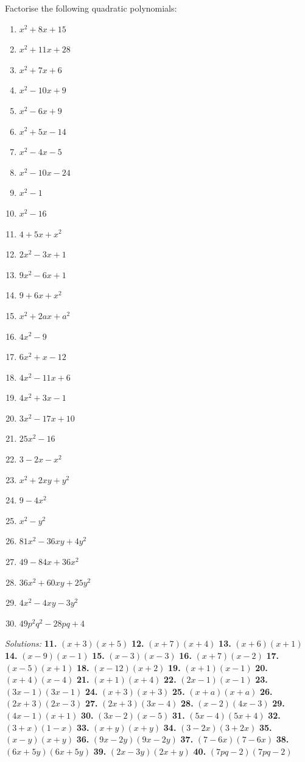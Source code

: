 \documentclass[
  12pt,
  oneside]{book}
\theoremstyle{definition}
\theoremstyle{definition}
\theoremstyle{definition}
\theoremstyle{definition}
\theoremstyle{remark}
\begin{document}
Factorise the following quadratic polynomials:

\begin{enumerate}
\def\labelenumi{\arabic{enumi}.}
\setcounter{enumi}{10}
\item
  \(x^2+8x+15\)
\item
  \(x^2+11x+28\)
\item
  \(x^2+7x+6\)
\item
  \(x^2-10x+9\)
\item
  \(x^2-6x+9\)
\item
  \(x^2+5x-14\)
\item
  \(x^2-4x-5\)
\item
  \(x^2-10x-24\)
\item
  \(x^2-1\)
\item
  \(x^2-16\)
\item
  \(4+5x+x^2\)
\item
  \(2x^2-3x+1\)
\item
  \(9x^2-6x+1\)
\item
  \(9+6x+x^2\)
\item
  \(x^2+2ax+a^2\)
\item
  \(4x^2-9\)
\item
  \(6x^2+x-12\)
\item
  \(4x^2-11x+6\)
\item
  \(4x^2+3x-1\)
\item
  \(3x^2 - 17x+10\)
\item
  \(25x^2-16\)
\item
  \(3-2x-x^2\)
\item
  \(x^2+2xy+y^2\)
\item
  \(9-4x^2\)
\item
  \(x^2-y^2\)
\item
  \(81x^2-36xy+4y^2\)
\item
  \(49-84x+36x^2\)
\item
  \(36x^2+60xy+25y^2\)
\item
  \(4x^2-4xy-3y^2\)
\item
  \(49p^2q^2 - 28pq +4\)
\end{enumerate}

\emph{Solutions:}
\textbf{11.} \((x+3)(x+5)\)
\textbf{12.} \((x+7)(x+4)\)
\textbf{13.} \((x+6)(x+1)\)
\textbf{14.} \((x-9)(x-1)\)
\textbf{15.} \((x-3)(x-3)\)
\textbf{16.} \((x+7)(x-2)\)
\textbf{17.} \((x-5)(x+1)\)
\textbf{18.} \((x-12)(x+2)\)
\textbf{19.} \((x+1)(x-1)\)
\textbf{20.} \((x+4)(x-4)\)
\textbf{21.} \((x+1)(x+4)\)
\textbf{22.} \((2x-1)(x-1)\)
\textbf{23.} \((3x-1)(3x-1)\)
\textbf{24.} \((x+3)(x+3)\)
\textbf{25.} \((x+a)(x+a)\)
\textbf{26.} \((2x+3)(2x-3)\)
\textbf{27.} \((2x+3)(3x-4)\)
\textbf{28.} \((x-2)(4x-3)\)
\textbf{29.} \((4x-1)(x+1)\)
\textbf{30.} \((3x-2)(x-5)\)
\textbf{31.} \((5x-4)(5x+4)\)
\textbf{32.} \((3+x)(1-x)\)
\textbf{33.} \((x+y)(x+y)\)
\textbf{34.} \((3-2x)(3+2x)\)
\textbf{35.} \((x-y)(x+y)\)
\textbf{36.} \((9x-2y)(9x-2y)\)
\textbf{37.} \((7-6x)(7-6x)\)
\textbf{38.} \((6x+5y)(6x+5y)\)
\textbf{39.} \((2x-3y)(2x+y)\)
\textbf{40.} \((7pq-2)(7pq-2)\)
\end{document}
